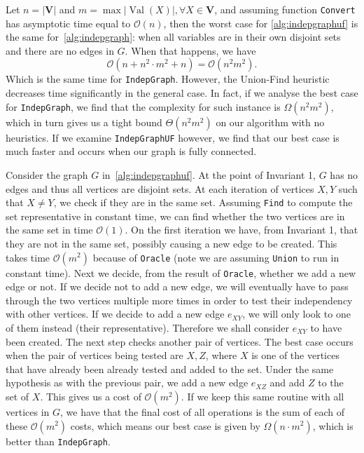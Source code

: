 \documentclass{amsart}
\DeclareMathOperator*{\Val}{\text{Val}}
\theoremstyle{plain}
\numberwithin{equation}{section}
\newcommand{\set}[1]{\mathbf{#1}}
\newcommand{\bigo}{\mathcal{O}}
\newcommand{\code}[1]{\lstinline[mathescape=true]{#1}}
\begin{document}
Let $n=|\set{V}|$ and $m=\max |\Val(X)|, \forall X\in\set{V}$, and assuming function \code{Convert}
has asymptotic time equal to $\bigo(n)$, then the worst case for \autoref{alg:indepgraphuf} is the
same for~\autoref{alg:indepgraph}: when all variables are in their own disjoint sets and there are
no edges in $G$. When that happens, we have
\begin{equation*}
  \bigo(n + n^2\cdot m^2 + n) = \bigo(n^2 m^2).
\end{equation*}
Which is the same time for \code{IndepGraph}. However, the Union-Find heuristic decreases time
significantly in the general case. In fact, if we analyse the best case for \code{IndepGraph}, we
find that the complexity for such instance is $\Omega(n^2 m^2)$, which in turn gives us a tight
bound $\Theta(n^2 m^2)$ on our algorithm with no heuristics. If we examine \code{IndepGraphUF}
however, we find that our best case is much faster and occurs when our graph is fully connected.

Consider the graph $G$ in~\autoref{alg:indepgraphuf}. At the point of Invariant 1, $G$ has no edges
and thus all vertices are disjoint sets. At each iteration of vertices $X,Y$ such that $X\neq Y$,
we check if they are in the same set. Assuming \code{Find} to compute the set representative in
constant time, we can find whether the two vertices are in the same set in time $\bigo(1)$. On the
first iteration we have, from Invariant 1, that they are not in the same set, possibly causing a
new edge to be created. This takes time $\bigo(m^2)$ because of \code{Oracle} (note we are
assuming \code{Union} to run in constant time). Next we decide, from the result of \code{Oracle},
whether we add a new edge or not. If we decide not to add a new edge, we will eventually have to
pass through the two vertices multiple more times in order to test their independency with other
vertices. If we decide to add a new edge $e_{XY}$, we will only look to one of them instead (their
representative).  Therefore we shall consider $e_{XY}$ to have been created. The next step checks
another pair of vertices. The best case occurs when the pair of vertices being tested are $X, Z$,
where $X$ is one of the vertices that have already been already tested and added to the set. Under
the same hypothesis as with the previous pair, we add a new edge $e_{XZ}$ and add $Z$ to the set of
$X$. This gives us a cost of $\bigo(m^2)$. If we keep this same routine with all vertices in $G$,
we have that the final cost of all operations is the sum of each of these $\bigo(m^2)$ costs, which
means our best case is given by $\Omega(n\cdot m^2)$, which is better than \code{IndepGraph}.
\end{document}
